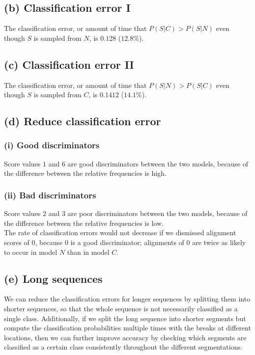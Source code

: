 \documentclass[11pt]{article}
\begin{document}
\subsection*{(b) Classification error I}
The classification error, or amount of time that $P(S | C) > P(S | N)$
even though $S$ is sampled from $N$, is $0.128$ ($12.8\%$).

\subsection*{(c) Classification error II}
The classification error, or amount of time that $P(S | N) > P(S | C)$
even though $S$ is sampled from $C$, is $0.1412$ ($14.1\%$).

\subsection*{(d) Reduce classification error}
\subsubsection*{(i) Good discriminators}
Score values $1$ and $6$ are good discriminators between the two models,
because of the difference between the relative frequencies is high.

\subsubsection*{(ii) Bad discriminators}
Score values $2$ and $3$ are poor discriminators between the two models,
because of the difference between the relative frequencies is low.\\

The rate of classification errors would not decrease if
we dismissed alignment scores of $0$, because
$0$ is a good discriminator; alignments of $0$
are twice as likely to occur in model $N$ than in
model $C$.

\subsection*{(e) Long sequences}
We can reduce the classification errors for longer sequences by
splitting them into shorter sequences, so that the whole
sequence is not necessarily classified as a single class.
Additionally, if we split the long sequence into
shorter segments but compute the classification
probabilities multiple times with the breaks at different locations,
then we can further improve accuracy by checking which segments are
classified as a certain class consistently throughout the
different segmentations.
\end{document}
